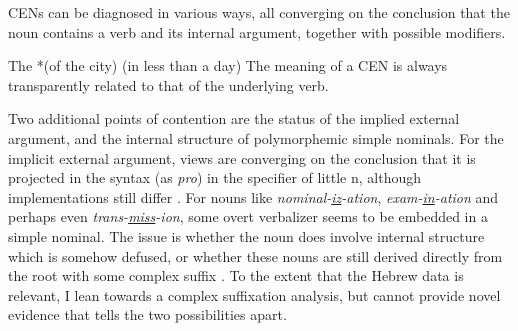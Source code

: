 \begin{exe}
\begin{xlist}
\begin{exe}
\begin{xlist}
\begin{exe}
\begin{exe}
\begin{xlist}
\begin{exe}
\begin{exe}
\begin{xlist}
\begin{exe}
\begin{xlist}
\begin{exe}
\begin{xlist}
\begin{exe}
\begin{xlist}
\begin{exe}
\begin{xlist}
\begin{xlist}
\begin{exe}
\begin{xlist}
\begin{exe}
\begin{xlist}
\begin{exe}
\begin{exe}
\begin{exe}
\begin{xlist}
\begin{exe}
\begin{exe}
\begin{xlist}
\begin{exe}
\begin{xlist}
\begin{exe}
\begin{xlist}
\begin{exe}
\begin{xlist}
\begin{xlist}
\begin{exe}
\begin{xlist}
\begin{exe}
\begin{xlist}
\begin{exe}
\begin{xlist}
\begin{exe}
\begin{xlist}
\begin{exe}
\begin{exe}
\begin{exe}
\begin{exe}
\begin{exe}
\begin{xlist}
\begin{xlist}
\begin{exe}
\begin{xlist}
\begin{exe}
\begin{xlist}
\begin{exe}
\begin{exe}
\begin{exe}
\begin{xlist}
\begin{exe}
\begin{xlist}
\begin{exe}
\begin{xlist}
\begin{exe}
\begin{exe}
\begin{xlist}
\begin{exe}
CENs can be diagnosed in various ways, all converging on the conclusion that the noun contains a verb and its internal argument, together with possible modifiers.
 \begin{exe}
\ex  The  *(of the city) (in less than a day) 
 \z 
The meaning of a CEN is always transparently related to that of the underlying verb.

Two additional points of contention are the status of the implied external argument, and the internal structure of polymorphemic simple nominals. For the implicit external argument, views are converging on the conclusion that it is projected in the syntax (as \textit{pro}) in the specifier of little n, although implementations still differ \citep{bruening13,layering15}. For nouns like \emph{nominal-\underline{iz}-ation}, \emph{exam-\underline{in}-ation} and perhaps even \emph{trans-\underline{miss}-ion}, some overt verbalizer seems to be embedded in a simple nominal. The issue is whether the noun does involve internal structure which is somehow defused, or whether these nouns are still derived directly from the root with some complex suffix \citep{alexiadou01,alexiadou08,alexiadou09,alexiadou17,borer14lingua,moulton14,wood19lsa}. To the extent that the Hebrew data is relevant, I lean towards a complex suffixation analysis, but cannot provide novel evidence that tells the two possibilities apart.


\end{exe}
\end{exe}
\end{xlist}
\end{exe}
\end{exe}
\end{xlist}
\end{exe}
\end{xlist}
\end{exe}
\end{xlist}
\end{exe}
\end{exe}
\end{exe}
\end{xlist}
\end{exe}
\end{xlist}
\end{exe}
\end{xlist}
\end{xlist}
\end{exe}
\end{exe}
\end{exe}
\end{exe}
\end{exe}
\end{xlist}
\end{exe}
\end{xlist}
\end{exe}
\end{xlist}
\end{exe}
\end{xlist}
\end{exe}
\end{xlist}
\end{xlist}
\end{exe}
\end{xlist}
\end{exe}
\end{xlist}
\end{exe}
\end{xlist}
\end{exe}
\end{exe}
\end{xlist}
\end{exe}
\end{exe}
\end{exe}
\end{xlist}
\end{exe}
\end{xlist}
\end{exe}
\end{xlist}
\end{xlist}
\end{exe}
\end{xlist}
\end{exe}
\end{xlist}
\end{exe}
\end{xlist}
\end{exe}
\end{xlist}
\end{exe}
\end{exe}
\end{xlist}
\end{exe}
\end{exe}
\end{xlist}
\end{exe}
\end{xlist}
\end{exe}
